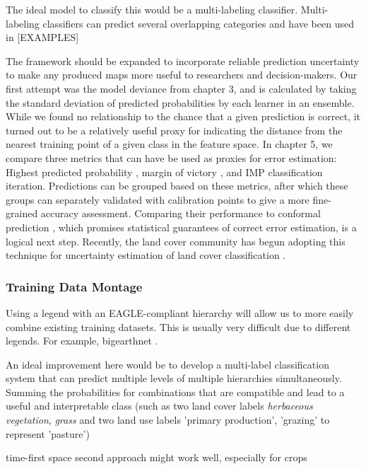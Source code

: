         The ideal model to classify this would be a multi-labeling classifier. Multi-labeling classifiers can predict several overlapping categories and have been used in [EXAMPLES]
        
        The framework should be expanded to incorporate reliable prediction uncertainty to make any produced maps more useful to researchers and decision-makers. Our first attempt was the model deviance from chapter 3, and is calculated by taking the standard deviation of predicted probabilities by each learner in an ensemble. While we found no relationship to the chance that a given prediction is correct, it turned out to be a relatively useful proxy for indicating the distance from the nearest training point of a given class in the feature space. In chapter 5, we compare three metrics that can have be used as proxies for error estimation: Highest predicted probability \citep{niculescu2005predicting}, margin of victory \citep{calderon2021high}, and IMP classification iteration. Predictions can be grouped based on these metrics, after which these groups can separately validated with calibration points to give a more fine-grained accuracy assessment. Comparing their performance to conformal prediction \citep{angelopoulos2023predictionpowered}, which promises statistical guarantees of correct error estimation, is a logical next step. Recently, the land cover community has begun adopting this technique for uncertainty estimation of land cover classification \citep{valle2023quantifying, singh2024uncertainty}.

        \subsubsection{Training Data Montage}

        Using a legend with an EAGLE-compliant hierarchy will allow us to more easily combine existing training datasets. This is usually very difficult due to different legends. For example, bigearthnet \citep{sumbul2021bigearthnet}. 

        An ideal improvement here would be to develop a multi-label classification system that can predict multiple levels of multiple hierarchies simultaneously. Summing the probabilities for combinations that are compatible and lead to a useful and interpretable class (such as two land cover labels \textit{herbaceous vegetation}, \textit{grass} and two land use labels 'primary production', 'grazing' to represent 'pasture')

        time-first space second approach might work well, especially for crops \citep{xu2021towards}

